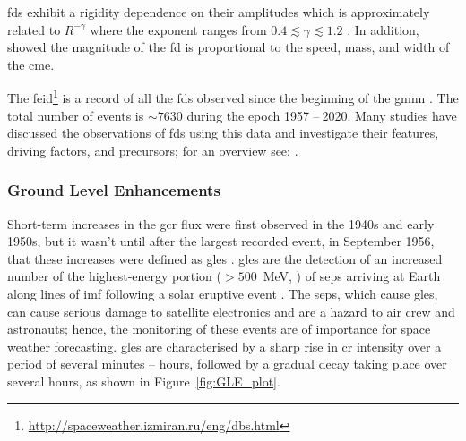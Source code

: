 \glspl{fd} exhibit a rigidity dependence on their amplitudes which is approximately related to $R^{-\gamma}$ where the exponent ranges from $0.4\lesssim\gamma\lesssim1.2$ \citep{lockwood_forbush_1971}. In addition, \citet{belov_what_2001, belov_coronal_2014} showed the magnitude of the \gls{fd} is proportional to the speed, mass, and width of the \gls{cme}. 


The \gls{feid}\footnote{\url{http://spaceweather.izmiran.ru/eng/dbs.html}} is a record of all the \glspl{fd} observed since the beginning of the \gls{gnmn} \citep{belov_forbush_2008}. The total number of events is $\sim 7630$ during the epoch 1957 -- 2020. Many studies have discussed the observations of \glspl{fd} using this data and investigate their features, driving factors, and precursors; for an overview see: \citet{belov_what_2001, usoskin_forbush_2008, wawrzynczak_modeling_2010, rockenbach_global_2014, arunbabu_how_2015}.



\subsubsection*{Ground Level Enhancements}\label{sec:intro_GLEs}

Short-term increases in the \gls{gcr} flux were first observed in the 1940s and early 1950s, but it wasn't until after the largest recorded event, in September 1956, that these increases were defined as \glspl{gle} \citep{cramp_modelling_1996}. \glspl{gle} are the detection of an increased number of the highest-energy portion ($> 500$~MeV, \citet{kuwabara_development_2006}) of \glspl{sep} arriving at Earth along lines of \gls{imf} following a solar eruptive event \citep{mccracken_high-energy_2012, poluianov_revisited_2017}. The \glspl{sep}, which cause \glspl{gle}, can cause serious damage to satellite electronics and are a hazard to air crew and astronauts; hence, the monitoring of these events are of importance for space weather forecasting. \glspl{gle} are characterised by a sharp rise in \gls{cr} intensity over a period of several minutes -- hours, followed by a gradual decay taking place over several hours, as shown in Figure~\ref{fig:GLE_plot}. 

